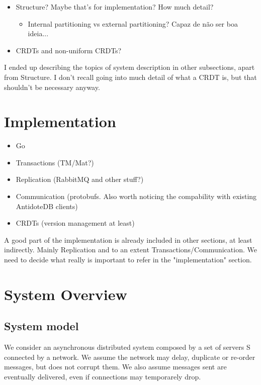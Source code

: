 \documentclass{vldb}
\newcommand{\grumbler}[2]{{\color{red}{\bf #1:} #2}}
\newcommand{\andre}[1]{\grumbler{andre}{#1}}
\begin{document}
\begin{itemize}
\item Structure? Maybe that's for implementation? How much detail?
\begin{itemize}
	\item Internal partitioning vs external partitioning? Capaz de não ser boa ideia...	
\end{itemize}
\item CRDTs and non-uniform CRDTs?
\end{itemize}

\andre{I ended up describing the topics of system description in other subsections, apart from Structure. I don't recall going into much detail of what a CRDT is, but that shouldn't be necessary anyway.}

\section{Implementation}

\begin{itemize}
	\item Go
	\item Transactions (TM/Mat?)
	\item Replication (RabbitMQ and other stuff?)
	\item Communication (protobufs. Also worth noticing the compability with existing AntidoteDB clients)
	\item CRDTs (version management at least)
\end{itemize}

\andre{A good part of the implementation is already included in other sections, at least indirectly. Mainly Replication and to an extent Transactions/Communication. We need to decide what really is important to refer in the "implementation" section.}

\null\newpage

\section{System Overview}

\subsection{System model}

We consider an asynchronous distributed system composed by a set of servers S connected by a network. We assume the network may delay, duplicate or re-order messages, but does not corrupt them. We also assume messages sent are eventually delivered, even if connections may temporarely drop.
\end{document}
